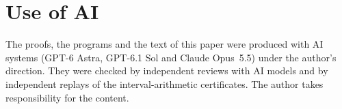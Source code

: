 \documentclass[11pt]{amsart}
\theoremstyle{remark}
\numberwithin{equation}{section}
\begin{document}
\section*{Use of AI}
The proofs, the programs and the text of this paper were produced with
AI systems (GPT-6 Astra, GPT-6.1 Sol and Claude Opus~5.5) under the
author's direction. They were checked by independent reviews with
AI models and by independent replays of the interval-arithmetic
certificates. The author takes responsibility for the content.



\end{document}

